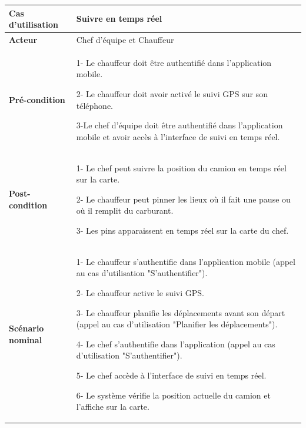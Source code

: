 \begin{table}[H]
    \centering
    \renewcommand{\arraystretch}{0.9}
    \begin{tabular}{|p{4cm}|p{9cm}|}
        \hline
        \textbf{Cas d'utilisation} & Suivre en temps réel                                                                                           \\
        \hline
        \textbf{Acteur}            & Chef d'équipe et Chauffeur                                                                                     \\
        \hline
        \textbf{Pré-condition}     & 1- Le chauffeur doit être authentifié dans l'application mobile.\newline

        2- Le chauffeur doit avoir activé le suivi GPS sur son téléphone.\newline

        3-Le chef d'équipe doit être authentifié dans l'application mobile et avoir accès à l'interface de suivi en temps réel.                     \\


        \hline
        \textbf{Post-condition}    & 1- Le chef peut suivre la position du camion en temps réel sur la carte.
        \newline

        2- Le chauffeur peut pinner les lieux où il fait une pause ou où il remplit du carburant.\newline

        3- Les pins apparaissent en temps réel sur la carte du chef.                                                                                \\
        \hline
        \textbf{Scénario nominal}  & 1- Le chauffeur s'authentifie dans l'application mobile (appel au cas d'utilisation "S'authentifier").\newline

        2- Le chauffeur active le suivi GPS.\newline

        3- Le chauffeur planifie les déplacements avant son départ (appel au cas d’utilisation "Planifier les déplacements").\newline

        4- Le chef s'authentifie dans l'application (appel au cas d'utilisation "S'authentifier").\newline

        5- Le chef accède à l'interface de suivi en temps réel.\newline

        6- Le système vérifie la position actuelle du camion et l'affiche sur la carte.\newline
        \\
    \end{tabular}

\end{table}





